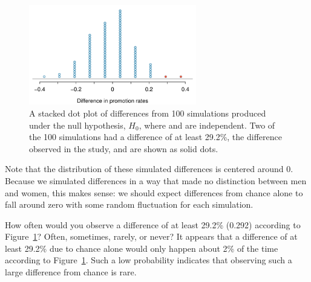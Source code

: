\begin{figure}[ht]
\centering
\includegraphics[width=0.65\textwidth]{02/figures/discRandDotPlot/discRandDotPlot}
\caption{A stacked dot plot of differences from 100 simulations produced under the null hypothesis, $H_0$, where  and  are independent. Two of the 100 simulations had a difference of at least 29.2\%, the difference observed in the study, and are shown as solid dots.}
\label{discRandDotPlot}
\end{figure}

Note that the distribution of these simulated differences is centered around 0. Because we simulated differences in a way that made no distinction between men and women, this makes sense: we should expect differences from chance alone to fall around zero with some random fluctuation for each simulation.

\begin{example}{How often would you observe a difference of at least 29.2\% (0.292) according to Figure~\ref{discRandDotPlot}? Often, sometimes, rarely, or never?}
It appears that a difference of at least 29.2\% due to chance alone would only happen about 2\% of the time according to Figure~\ref{discRandDotPlot}. Such a low probability indicates that observing such a large difference from chance is rare.
\end{example}


